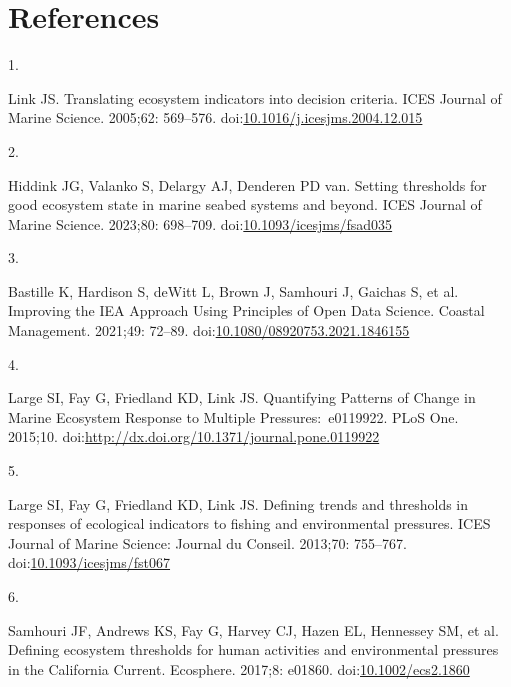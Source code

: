 \documentclass[
]{article}
\newlength{\cslhangindent}
\newlength{\csllabelwidth}
\newenvironment{CSLReferences}[2] %
 {\begin{list}{}{%
  \setlength{\itemindent}{0pt}
  \setlength{\leftmargin}{0pt}
  \setlength{\parsep}{0pt}
  \ifodd #1
   \setlength{\leftmargin}{\cslhangindent}
   \setlength{\itemindent}{-1\cslhangindent}
  \fi
  \setlength{\itemsep}{#2\baselineskip}}}
 {\end{list}}
\newcommand{\CSLLeftMargin}[1]{\parbox[t]{\csllabelwidth}{\strut#1\strut}}
\newcommand{\CSLRightInline}[1]{\parbox[t]{\linewidth - \csllabelwidth}{\strut#1\strut}}
\begin{document}
\section*{References}\label{references}

\label{refs}
\begin{CSLReferences}{0}{1}
\CSLLeftMargin{1. }%
\CSLRightInline{Link JS. Translating ecosystem indicators into decision criteria. ICES Journal of Marine Science. 2005;62: 569--576. doi:\href{https://doi.org/10.1016/j.icesjms.2004.12.015}{10.1016/j.icesjms.2004.12.015}}

\CSLLeftMargin{2. }%
\CSLRightInline{Hiddink JG, Valanko S, Delargy AJ, Denderen PD van. Setting thresholds for good ecosystem state in marine seabed systems and beyond. ICES Journal of Marine Science. 2023;80: 698--709. doi:\href{https://doi.org/10.1093/icesjms/fsad035}{10.1093/icesjms/fsad035}}

\CSLLeftMargin{3. }%
\CSLRightInline{Bastille K, Hardison S, deWitt L, Brown J, Samhouri J, Gaichas S, et al. Improving the {IEA} {Approach} {Using} {Principles} of {Open} {Data} {Science}. Coastal Management. 2021;49: 72--89. doi:\href{https://doi.org/10.1080/08920753.2021.1846155}{10.1080/08920753.2021.1846155}}

\CSLLeftMargin{4. }%
\CSLRightInline{Large SI, Fay G, Friedland KD, Link JS. Quantifying {Patterns} of {Change} in {Marine} {Ecosystem} {Response} to {Multiple} {Pressures}:~e0119922. PLoS One. 2015;10. doi:\url{http://dx.doi.org/10.1371/journal.pone.0119922}}

\CSLLeftMargin{5. }%
\CSLRightInline{Large SI, Fay G, Friedland KD, Link JS. Defining trends and thresholds in responses of ecological indicators to fishing and environmental pressures. ICES Journal of Marine Science: Journal du Conseil. 2013;70: 755--767. doi:\href{https://doi.org/10.1093/icesjms/fst067}{10.1093/icesjms/fst067}}

\CSLLeftMargin{6. }%
\CSLRightInline{Samhouri JF, Andrews KS, Fay G, Harvey CJ, Hazen EL, Hennessey SM, et al. Defining ecosystem thresholds for human activities and environmental pressures in the {California} {Current}. Ecosphere. 2017;8: e01860. doi:\href{https://doi.org/10.1002/ecs2.1860}{10.1002/ecs2.1860}}


\end{CSLReferences}
\end{document}
